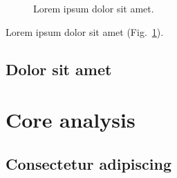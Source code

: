 \documentclass[11pt]{article}
\begin{document}
\lipsum[3]

\begin{figure}[tbp]
  \centering
  \caption{Lorem ipsum dolor sit amet.}
  \label{fig:example}
\end{figure}

Lorem ipsum dolor sit amet (Fig.~\ref{fig:example}).

\subsection{Dolor sit amet}

\lipsum[4]

\section{Core analysis}

\subsection{Consectetur adipiscing}

\lipsum[5]
\end{document}
